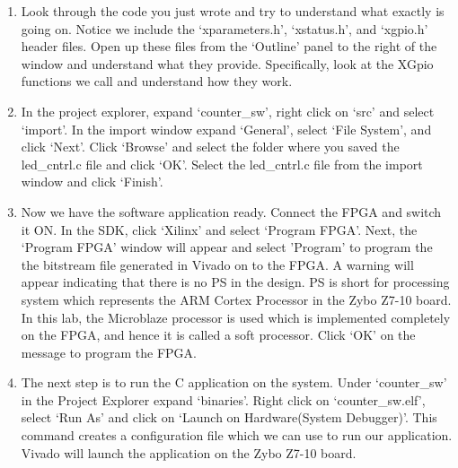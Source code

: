 \documentclass[11pt,twoside,titlepage]{article}
\begin{document}
\begin{enumerate}
\begin{enumerate}
\begin{lstlisting}
int  delay (void) ;

int main()
{
	int count;
	int count_masked;
	XGpio leds;
	int status;
	
	status=XGpio_Initialize(&leds,GPIO_DEVICE_ID);
	XGpio_SetDataDirection(&leds,1,0x00);
	if (status != XST_SUCCESS) {
		xil_printf("Initialization failed");
	}
	count=0;
	while(1)
	{
		count_masked=count & 0xF ;
		XGpio_DiscreteWrite(&leds,1,count_masked);
		xil_printf("Value of LEDs = 0x%x\n\r", count_masked);
		delay();
		count++;
	}
	return(0);
}

int delay(void)
{
	volatile int delay_count=0;
	while(delay_count < WAIT_VAL)
	delay_count++;
	return (0);
}
			
			
			\end{lstlisting}
			\item Look through the code you just wrote and try to understand what exactly is going on. Notice we include the `xparameters.h', `xstatus.h', and `xgpio.h' header files.  Open up these files from  the `Outline' panel to the right of the window and understand what they provide. Specifically, look at the XGpio functions we call and understand how they work.
			
			\item In the project explorer, expand `counter\_sw', right click on `src' and select `import'. In the import window expand `General', select `File System', and click `Next'. Click `Browse' and select the folder where you saved the led\_cntrl.c file and click `OK'. Select the led\_cntrl.c file from the import window and click `Finish'.
			\item Now we have the software application ready. Connect the FPGA and switch it ON. In the SDK, click `Xilinx' and select `Program FPGA'. Next, the `Program FPGA' window will appear and select 'Program' to program the the bitstream file generated in Vivado on to the FPGA. A warning will appear indicating that there is no PS in the design. PS is short for processing system which represents the ARM Cortex Processor in the Zybo Z7-10 board. In this lab, the Microblaze processor is used which is implemented completely on the FPGA, and hence it is called a soft processor. Click `OK' on the message to program the FPGA.
			
			\item The next step is to run the C application on the system. Under `counter\_sw' in the Project Explorer expand `binaries'. Right click on `counter\_sw.elf', select `Run As' and click on `Launch on Hardware(System Debugger)'. This command creates a configuration file which we can use to run our application. Vivado will launch the application on the Zybo Z7-10 board.
			

\end{enumerate}
\end{enumerate}
\end{document}
